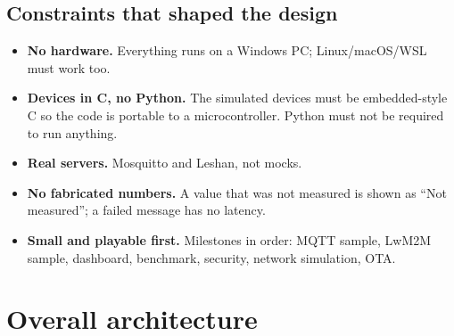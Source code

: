 \documentclass[11pt,a4paper]{article}
\begin{document}
\subsection{Constraints that shaped the design}
\begin{itemize}
  \item \textbf{No hardware.} Everything runs on a Windows PC; Linux/macOS/WSL
        must work too.
  \item \textbf{Devices in C, no Python.} The simulated devices must be
        embedded-style C so the code is portable to a microcontroller. Python
        must not be required to run anything.
  \item \textbf{Real servers.} Mosquitto and Leshan, not mocks.
  \item \textbf{No fabricated numbers.} A value that was not measured is shown
        as ``Not measured''; a failed message has no latency.
  \item \textbf{Small and playable first.} Milestones in order: MQTT sample,
        LwM2M sample, dashboard, benchmark, security, network simulation, OTA.
\end{itemize}

\section{Overall architecture}
\end{document}

